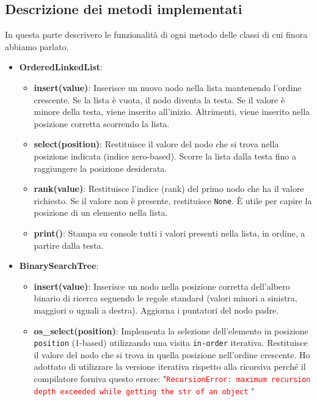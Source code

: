 \documentclass[10pt]{article}
\begin{document}
\subsection{Descrizione dei metodi implementati}
In questa parte descrivero le funzionalità di ogni metodo delle classi di cui finora abbiamo parlato. 
\begin{itemize}
    \item \textbf{OrderedLinkedList}:
    \begin{itemize}
         \item \textbf{insert(value)}: Inserisce un nuovo nodo nella lista mantenendo l'ordine crescente. Se la lista è vuota, il nodo diventa la testa. Se il valore è minore della testa, viene inserito all'inizio. Altrimenti, viene inserito nella posizione corretta scorrendo la lista.
        
        \item \textbf{select(position)}: Restituisce il valore del nodo che si trova nella posizione indicata (indice zero-based). Scorre la lista dalla testa fino a raggiungere la posizione desiderata.

        \item \textbf{rank(value)}: Restituisce l'indice (rank) del primo nodo che ha il valore richiesto. Se il valore non è presente, restituisce \texttt{None}. È utile per capire la posizione di un elemento nella lista.

        \item \textbf{print()}: Stampa su console tutti i valori presenti nella lista, in ordine, a partire dalla testa.
    \end{itemize}
    \item \textbf{BinarySearchTree}:
    \begin{itemize}
       \item \textbf{insert(value)}: Inserisce un nodo nella posizione corretta dell’albero binario di ricerca seguendo le regole standard (valori minori a sinistra, maggiori o uguali a destra). Aggiorna i puntatori del nodo padre.
        
        \item \textbf{os\_select(position)}: Implementa la selezione dell’elemento in posizione \texttt{position} (1-based) utilizzando una visita \texttt{in-order} iterativa. Restituisce il valore del nodo che si trova in quella posizione nell’ordine crescente. Ho adottato di utilizzare la versione iterativa rispetto alla ricorsiva perché il compilatore forniva questo errore: "\texttt{\textcolor{red}{RecursionError: maximum recursion depth exceeded while 
        \newline
        getting the str of an object}}
"


\end{itemize}
\end{itemize}
\end{document}
